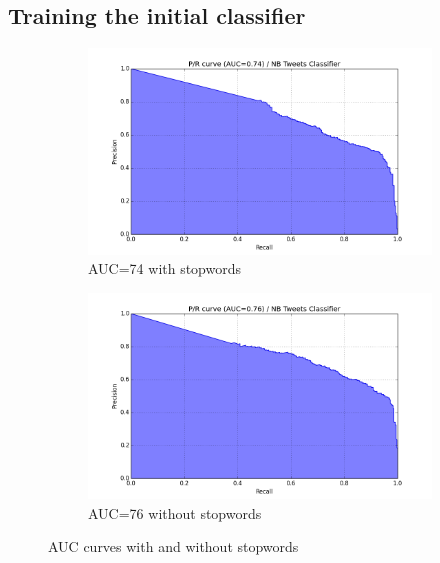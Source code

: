 \subsection{Training the initial classifier}
\begin{figure}
  \centering
  \begin{subfigure}[b]{0.49\linewidth}
    \includegraphics[width=\linewidth]{Figures/pr_NB_Tweets_Classifier_01}
  \caption{AUC=74 with stopwords}
  \label{fig:auc-with-stopwords}
  \end{subfigure}
  \begin{subfigure}[b]{0.49\linewidth}
      \includegraphics[width=\linewidth]{Figures/pr_NB_Tweets_Classifier_02}
  \caption{AUC=76 without stopwords}
  \label{fig:auc-without-stopwords}
  \end{subfigure}

\caption{AUC curves with and without stopwords}
\label{fig:auc-curves-stopwords}
\end{figure}

